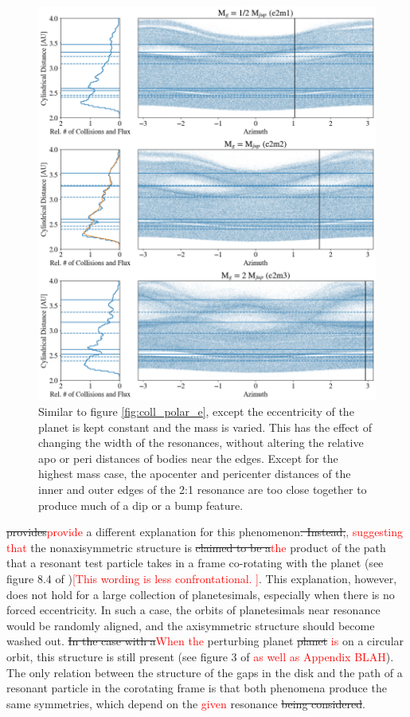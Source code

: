 \documentclass[twocolumn]{aastex63}
\newcommand{\ACBc}[1]{\textcolor{red}{#1}}
\begin{document}
\begin{figure}
    \includegraphics[width=\textwidth]{figures/coll_polar_m.png}
    \caption{Similar to figure \ref{fig:coll_polar_e}, except the eccentricity of the planet is kept constant and the mass is varied.
    This has the effect of changing the width of the resonances, without altering the relative apo or peri distances of
    bodies near the edges. Except for the highest mass case, the apocenter and pericenter distances of the inner and outer edges of the 2:1 
    resonance are too close together to produce much of a dip or a bump feature.\label{fig:coll_polar_m}}
\end{figure}

\citet{2016ApJ...818..159T} \sout{provides}\ACBc{provide} a different explanation for this phenomenon\sout{. Instead,}\ACBc{, suggesting that} the nonaxisymmetric structure is \sout{claimed to be a}\ACBc{the} product 
of the path that a resonant test particle takes in a frame co-rotating with the planet (see figure 8.4 of \citet{2000ssd..book.....M})\ACBc{[This wording is less confrontational. ]}. This explanation, 
however, does not hold for a large collection of planetesimals, especially when there is no forced eccentricity. In such a case, the orbits of 
planetesimals near resonance would be randomly aligned, and the axisymmetric structure should become washed out. \sout{In the case with a}\ACBc{When the} perturbing 
planet \sout{planet} \ACBc{is} on a circular orbit, this structure is still present (see figure 3 of \citet{2016ApJ...818..159T}\ACBc{ as well as Appendix BLAH}). 
The only relation between the structure of 
the gaps in the disk and the path of a resonant particle in the corotating frame is that both phenomena produce the same symmetries, which depend 
on the \ACBc{given} resonance \sout{being considered}.
\end{document}
